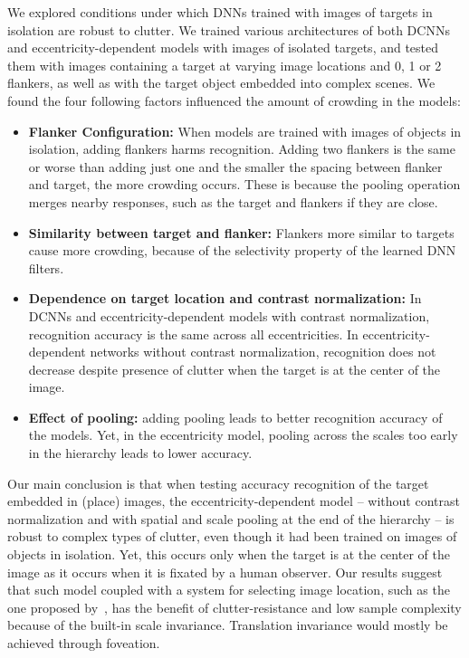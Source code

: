 \documentclass{article}
\begin{document}
We explored conditions under which DNNs trained with images of targets in isolation are robust to clutter.  We trained various architectures of both DCNNs and eccentricity-dependent models with images of isolated targets, and tested them with images containing a target at varying image locations and 0, 1 or 2 flankers, as well as with the target object embedded into complex scenes.
We found the four following factors influenced the amount of crowding in the models:
\vspace*{-0.15cm}\begin{itemize}[noitemsep,topsep=0pt,partopsep=0px,leftmargin=*]
\item \textbf{Flanker Configuration:}
When models are trained with images of objects in isolation, adding flankers harms recognition.
Adding two flankers is the same or worse than adding just one and the smaller the spacing between flanker and target, the more crowding occurs.
These is because the pooling operation merges nearby responses, such as the target and flankers if they are close.

\item \textbf{Similarity between target and flanker:}
Flankers more similar to targets cause more crowding, because of the selectivity property of the learned DNN filters.
\item \textbf{Dependence on target location and contrast normalization:}
In DCNNs and eccentricity-dependent models with contrast normalization, recognition accuracy is the same across all eccentricities.
In eccentricity-dependent networks without contrast normalization, recognition does not decrease despite presence of clutter when the target is at the center of the image.
\item \textbf{Effect of pooling:} adding pooling leads to better recognition accuracy of the models.  Yet, in the eccentricity model, pooling across the scales too early in the hierarchy leads to lower accuracy.
\end{itemize}

Our main conclusion is that when testing accuracy recognition of the target embedded in  (place) images, the eccentricity-dependent model --  without contrast normalization and with spatial and scale pooling at the end of the hierarchy --  is robust to complex types of clutter, even though it had been trained on images of objects in isolation.  Yet, this  occurs only when the target is at the center of the image as it occurs when it is fixated by a human observer.  
Our results suggest that such model coupled with a system for selecting image location, such as the one proposed by~\cite{mnih2014recurrent}, has the benefit of clutter-resistance and low sample complexity because of the built-in scale invariance. Translation invariance would mostly be achieved  through foveation. 
\end{document}
